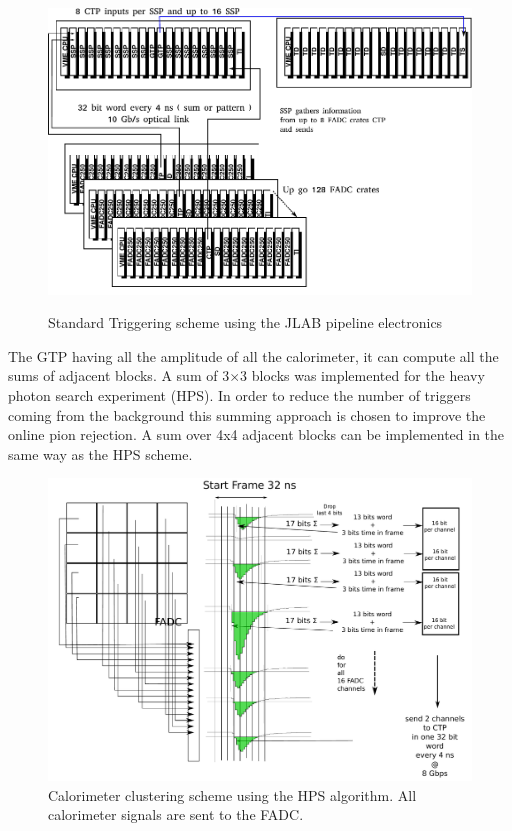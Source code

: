 \documentclass{article}
\begin{document}
\begin{figure}
	\centering
	\includegraphics[width=\textwidth]{figs/TriggerPipeline.pdf}\\
	\caption{Standard Triggering scheme using the JLAB pipeline electronics}\label{fig:pipeline_daq}
\end{figure}

The GTP having all the amplitude of all the calorimeter, it can compute all the sums of adjacent blocks.
A sum of 3$\times$3 blocks was implemented for the heavy photon search experiment (HPS).
In order to reduce the number of triggers coming from the background this summing approach is chosen to improve the online pion rejection.
A sum over 4x4 adjacent blocks can be implemented in the same way as the HPS scheme. 

\begin{figure}
	\centering
	\includegraphics[width=\textwidth]{figs/CaloTrigger.pdf}
	\caption{Calorimeter clustering scheme using the HPS algorithm. All calorimeter signals are sent to the FADC. }\label{fig:ClustHPS}
\end{figure}
\end{document}
